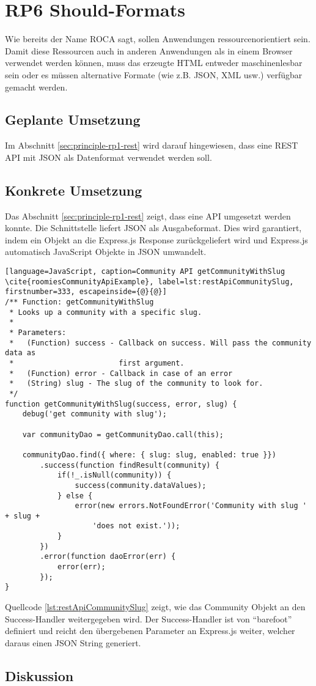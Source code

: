 \section{RP6 Should-Formats}
\label{sec:principle-rp6-should-formats}
Wie bereits der Name ROCA sagt, sollen Anwendungen ressourcenorientiert sein. Damit diese Ressourcen auch in anderen Anwendungen als in einem Browser verwendet werden können, muss das erzeugte HTML entweder maschinenlesbar sein oder es müssen alternative Formate (wie z.B. JSON, XML usw.) verfügbar gemacht werden.

\subsection*{Geplante Umsetzung}
Im Abschnitt \ref{sec:principle-rp1-rest}  wird darauf hingewiesen, dass eine REST API mit JSON als Datenformat verwendet werden soll.

\subsection*{Konkrete Umsetzung}
Das Abschnitt \ref{sec:principle-rp1-rest}  zeigt, dass eine API umgesetzt werden konnte.
Die Schnittstelle liefert JSON als Ausgabeformat. Dies wird garantiert, indem ein Objekt an die Express.js Response \cite{ExpressjsResSend} zurückgeliefert wird und Express.js automatisch JavaScript Objekte in JSON umwandelt.

\begin{lstlisting}[language=JavaScript, caption=Community API getCommunityWithSlug \cite{roomiesCommunityApiExample}, label=lst:restApiCommunitySlug, firstnumber=333, escapeinside={@}{@}]
/** Function: getCommunityWithSlug
 * Looks up a community with a specific slug.
 *
 * Parameters:
 *   (Function) success - Callback on success. Will pass the community data as
 *                        first argument.
 *   (Function) error - Callback in case of an error
 *   (String) slug - The slug of the community to look for.
 */
function getCommunityWithSlug(success, error, slug) {
	debug('get community with slug');

	var communityDao = getCommunityDao.call(this);

	communityDao.find({ where: { slug: slug, enabled: true }})
		.success(function findResult(community) {
			if(!_.isNull(community)) {
				success(community.dataValues);
			} else {
				error(new errors.NotFoundError('Community with slug ' + slug +
					'does not exist.'));
			}
		})
		.error(function daoError(err) {
			error(err);
		});
}
\end{lstlisting}

Quellcode \ref{lst:restApiCommunitySlug} zeigt, wie das Community Objekt an den Success-Handler weitergegeben wird. Der Success-Handler ist von ``barefoot'' definiert und reicht den übergebenen Parameter an Express.js weiter, welcher daraus einen JSON String generiert.

\subsection*{Diskussion}
